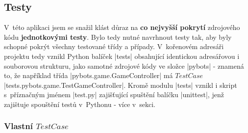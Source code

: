 \subsection{Testy}
\begin{sloppypar}
    V~této aplikaci jsem se snažil klást důraz na \textbf{co nejvyšší pokrytí} zdrojového kódu \textbf{jednotkovými testy}. Bylo tedy nutné navrhnout testy tak, aby byly schopné pokrýt všechny testované třídy a případy. V~kořenovém adresáři projektu tedy vznikl Python balíček \ic|tests| obsahující identickou adresářovou i souborovou strukturu, jako samotné zdrojové kódy ve složce \ic|pybots| - znamená to, že například třída \ic|pybots.game.GameController| má $TestCase$ \ic|tests.pybots.game.TestGameController|. Kromě modulu \ic|tests| vznikl i skript s~příznačným jménem \ic|test.py| zajišťující spuštění balíčku \ic|unittest|, jenž zajištuje spouštění testů v~Pythonu - více v~sekci.
\end{sloppypar}

\subsubsection{Vlastní $TestCase$}

